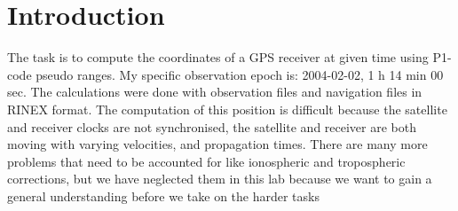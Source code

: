 \section{Introduction} 

\label{sec:introduction}  The task is to compute the coordinates of a GPS receiver at given time using P1-code pseudo ranges. My specific observation epoch is: 2004-02-02, 1 h 14 min 00 sec. The calculations were done with observation files and navigation files in RINEX format. The computation of this position is difficult because the satellite and receiver clocks are not synchronised, the satellite and receiver are both moving with varying velocities, and propagation times. There are many more problems that need to be accounted for like ionospheric and tropospheric corrections, but we have neglected them in this lab because we want to gain a general understanding before we take on the harder tasks


